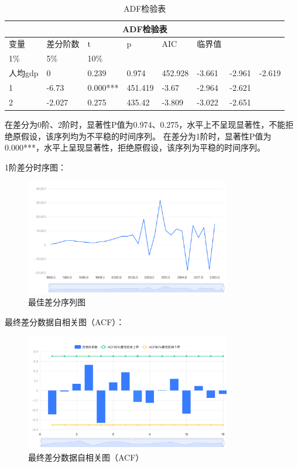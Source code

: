 \documentclass[12pt, a4paper, oneside]{ctexart}
\begin{document}
\begin{table}[H]
  \centering
  \begin{tabularx}{0.9\textwidth}{llXXXXXX}
  \toprule
  \multicolumn{8}{c}{ADF检验表}\\
  \midrule
  变量 & 差分阶数 & t & p & AIC & 临界值 & & \\
  1\% & 5\% & 10\% & & & & & \\
  人均gdp & 0 & 0.239 & 0.974 & 452.928 & -3.661 & -2.961 & -2.619 \\
  1 & -6.73 & 0.000*** & 451.419 & -3.67 & -2.964 & -2.621 & \\
  2 & -2.027 & 0.275 & 435.42 & -3.809 & -3.022 & -2.651 & \\
  \bottomrule
  \end{tabularx}
  \caption{ADF检验表}
  \label{tab:ADF}
\end{table}

在差分为0阶、2阶时，显著性P值为0.974、0.275，水平上不呈现显著性，不能拒绝原假设，该序列均为不平稳的时间序列。
在差分为1阶时，显著性P值为0.000***，水平上呈现显著性，拒绝原假设，该序列为平稳的时间序列。

1阶差分时序图：

\begin{figure}[H]
  \centering
  \includegraphics[width=0.8\textwidth]{pic/最佳差分序列图.png}
  \caption{最佳差分序列图}
  \label{fig:最佳差分序列图}
\end{figure}



最终差分数据自相关图（ACF）：

\begin{figure}[H]
  \centering
  \includegraphics[width=0.8\textwidth]{pic/最终差分数据自相关图（ACF） (1).png}
  \caption{最终差分数据自相关图（ACF）}
  \label{fig:ACF}
\end{figure}
\end{document}
